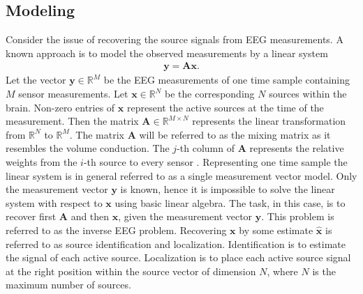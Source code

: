 %     


\subsection{Modeling}
Consider the issue of recovering the source signals from EEG measurements. A known approach is to model the observed measurements by a linear system 
\begin{align*}
\mathbf{y} = \mathbf{Ax}.
\end{align*}
Let the vector $\mathbf{y} \in \mathbb{R}^{M}$ be the EEG measurements of one time sample containing $M$ sensor measurements. Let $\mathbf{x} \in \mathbb{R}^{N}$ be the corresponding $N$ sources within the brain. 
Non-zero entries of $\textbf{x}$ represent the active sources at the time of the measurement. 
Then the matrix $\mathbf{A} \in \mathbb{R}^{M \times N}$ represents the linear transformation from $\mathbb{R}^{N}$ to $\mathbb{R}^{M}$. The matrix $\mathbf{A}$ will be referred to as the mixing matrix as it resembles the volume conduction. 
The $j$-th column of $\mathbf{A}$ represents the relative weights from the $i$-th source to every sensor \cite{phd2015}. 
Representing one time sample the linear system is in general referred to as a single measurement vector model. 
Only the measurement vector $\mathbf{y}$ is known, hence it is impossible to solve the linear system with respect to $\mathbf{x}$ using basic linear algebra. 
The task, in this case, is to recover first $\mathbf{A}$ and then $\mathbf{x}$, given the measurement vector $\mathbf{y}$. This problem is referred to as the inverse EEG problem. 
Recovering $\mathbf{x}$ by some estimate $\hat{\mathbf{x}}$ is referred to as source identification and localization. Identification is to estimate the signal of each active source. Localization is to place each active source signal at the right position within the source vector of dimension $N$, where $N$ is the maximum number of sources.      

